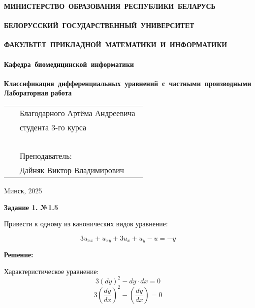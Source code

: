 \documentclass[a4paper,12pt]{article}
\begin{document}
\setcounter{page}{1}
\thispagestyle{empty}
\begin{center}
\bf
\vspace{4cm}
{
\mbox{МИНИСТЕРСТВО~ОБРАЗОВАНИЯ~РЕСПУБЛИКИ~БЕЛАРУСЬ} \\~\\
\mbox{БЕЛОРУССКИЙ~ГОСУДАРСТВЕННЫЙ~УНИВЕРСИТЕТ} \\~\\
\mbox{ФАКУЛЬТЕТ~ПРИКЛАДНОЙ~МАТЕМАТИКИ~И~ИНФОРМАТИКИ} \\~\\
\mbox{Кафедра~биомедицинской~информатики} \\~\\
}
\vspace{4cm}
\bf
\mbox{Классификация дифференциальных уравнений с частными производными}\\
\vspace{1cm}
\rm Лабораторная работа 
\vspace{3cm}
\end{center}
\begin{tabular}{ll}
\hspace{10.5cm}
&Благодарного Артёма Андреевича~\\
&студента 3-го курса\\~\\
&Преподаватель:\\
&Дайняк Виктор Владимирович
\end{tabular}
\vspace{7cm}
\begin{center}
Mинск, 2025
\end{center}
\clearpage
\restoregeometry

\begin{center}    
\noindent \textbf{Задание 1. №1.5}
\end{center}

Привести к одному из канонических видов уравнение:

\begin{equation*}
    3u_{xx} + u_{xy} + 3u_{x} + u_{y} - u = -y
\end{equation*}

\textbf{Решение:}

Характеристическое уравнение:
\begin{equation*}
    3 (dy)^2 - dy \cdot dx = 0
\end{equation*}
\begin{equation*}
   3 \left( \frac{dy}{dx} \right)^2 - \left( \frac{dy}{dx} \right) = 0
\end{equation*}
\end{document}
